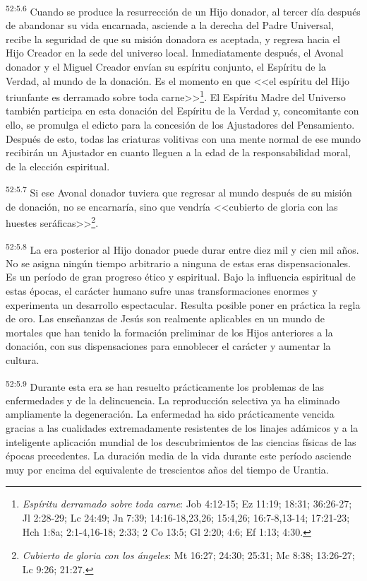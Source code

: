 \par
\textsuperscript{52:5.6} Cuando se produce la resurrección de un Hijo donador, al tercer día después de abandonar su vida encarnada, asciende a la derecha del Padre Universal, recibe la seguridad de que su misión donadora es aceptada, y regresa hacia el Hijo Creador en la sede del universo local. Inmediatamente después, el Avonal donador y el Miguel Creador envían su espíritu conjunto, el Espíritu de la Verdad, al mundo de la donación. Es el momento en que <<el espíritu del Hijo triunfante es derramado sobre toda carne>>\footnote{\textit{Espíritu derramado sobre toda carne}: Job 4:12-15; Ez 11:19; 18:31; 36:26-27; Jl 2:28-29; Lc 24:49; Jn 7:39; 14:16-18,23,26; 15:4,26; 16:7-8,13-14; 17:21-23; Hch 1:8a; 2:1-4,16-18; 2:33; 2 Co 13:5; Gl 2:20; 4:6; Ef 1:13; 4:30.}. El Espíritu Madre del Universo también participa en esta donación del Espíritu de la Verdad y, concomitante con ello, se promulga el edicto para la concesión de los Ajustadores del Pensamiento. Después de esto, todas las criaturas volitivas con una mente normal de ese mundo recibirán un Ajustador en cuanto lleguen a la edad de la responsabilidad moral, de la elección espiritual.

\par
\textsuperscript{52:5.7} Si ese Avonal donador tuviera que regresar al mundo después de su misión de donación, no se encarnaría, sino que vendría <<cubierto de gloria con las huestes seráficas>>\footnote{\textit{Cubierto de gloria con los ángeles}: Mt 16:27; 24:30; 25:31; Mc 8:38; 13:26-27; Lc 9:26; 21:27.}.

\par
\textsuperscript{52:5.8} La era posterior al Hijo donador puede durar entre diez mil y cien mil años. No se asigna ningún tiempo arbitrario a ninguna de estas eras dispensacionales. Es un período de gran progreso ético y espiritual. Bajo la influencia espiritual de estas épocas, el carácter humano sufre unas transformaciones enormes y experimenta un desarrollo espectacular. Resulta posible poner en práctica la regla de oro. Las enseñanzas de Jesús son realmente aplicables en un mundo de mortales que han tenido la formación preliminar de los Hijos anteriores a la donación, con sus dispensaciones para ennoblecer el carácter y aumentar la cultura.

\par
\textsuperscript{52:5.9} Durante esta era se han resuelto prácticamente los problemas de las enfermedades y de la delincuencia. La reproducción selectiva ya ha eliminado ampliamente la degeneración. La enfermedad ha sido prácticamente vencida gracias a las cualidades extremadamente resistentes de los linajes adámicos y a la inteligente aplicación mundial de los descubrimientos de las ciencias físicas de las épocas precedentes. La duración media de la vida durante este período asciende muy por encima del equivalente de trescientos años del tiempo de Urantia.

